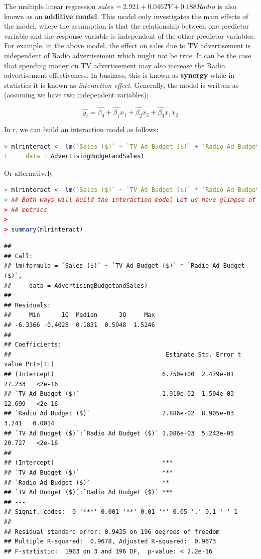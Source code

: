 \documentclass[
]{article}
\begin{document}
The multiple linear regression \(sales=2.921+0.046TV+0.188Radio\) is
also known as an \textbf{additive model}. This model only investigates
the main effects of the model, where the assumption is that the
relationship between one predictor variable and the response variable is
independent of the other predictor variables. For example, in the above
model, the effect on sales due to TV advertisement is independent of
Radio advertisement which might not be true. It can be the case that
spending money on TV advertisement may also increase the Radio
advertisement effectiveness. In business, this is known as
\textbf{synergy} while in statistics it is known as \emph{interaction
effect}. Generally, the model is written as (assuming we have two
independent variables);

\[\hat{y_i}=\hat{\beta_0}+\hat{\beta_1}x_1+\hat{\beta_2}x_2+\hat{\beta_3}x_1x_2\]

In r, we can build an interaction model as follows;

\begin{lstlisting}[language=R]
> mlrinteract <- lm(`Sales ($)` ~ `TV Ad Budget ($)` + `Radio Ad Budget ($)` + `TV Ad Budget ($)`:`Radio Ad Budget ($)`,
+     data = AdvertisingBudgetandSales)
\end{lstlisting}

Or alternatively

\begin{lstlisting}[language=R]
> mlrinteract <- lm(`Sales ($)` ~ `TV Ad Budget ($)` * `Radio Ad Budget ($)`, data = AdvertisingBudgetandSales)
> ## Both ways will build the interaction model Let us have glimpse of the model
> ## metrics
> 
> summary(mlrinteract)
\end{lstlisting}

\begin{lstlisting}
## 
## Call:
## lm(formula = `Sales ($)` ~ `TV Ad Budget ($)` * `Radio Ad Budget ($)`, 
##     data = AdvertisingBudgetandSales)
## 
## Residuals:
##     Min      1Q  Median      3Q     Max 
## -6.3366 -0.4028  0.1831  0.5948  1.5246 
## 
## Coefficients:
##                                           Estimate Std. Error t value Pr(>|t|)
## (Intercept)                              6.750e+00  2.479e-01  27.233   <2e-16
## `TV Ad Budget ($)`                       1.910e-02  1.504e-03  12.699   <2e-16
## `Radio Ad Budget ($)`                    2.886e-02  8.905e-03   3.241   0.0014
## `TV Ad Budget ($)`:`Radio Ad Budget ($)` 1.086e-03  5.242e-05  20.727   <2e-16
##                                             
## (Intercept)                              ***
## `TV Ad Budget ($)`                       ***
## `Radio Ad Budget ($)`                    ** 
## `TV Ad Budget ($)`:`Radio Ad Budget ($)` ***
## ---
## Signif. codes:  0 '***' 0.001 '**' 0.01 '*' 0.05 '.' 0.1 ' ' 1
## 
## Residual standard error: 0.9435 on 196 degrees of freedom
## Multiple R-squared:  0.9678, Adjusted R-squared:  0.9673 
## F-statistic:  1963 on 3 and 196 DF,  p-value: < 2.2e-16
\end{lstlisting}
\end{document}
